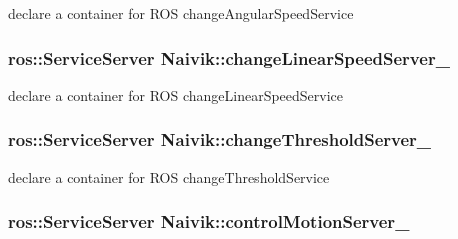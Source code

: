 declare a container for R\+OS change\+Angular\+Speed\+Service 

\subsubsection[{\texorpdfstring{change\+Linear\+Speed\+Server\+\_\+}{changeLinearSpeedServer_}}]{\setlength{\rightskip}{0pt plus 5cm}ros\+::\+Service\+Server Naivik\+::change\+Linear\+Speed\+Server\+\_\+\hspace{0.3cm}{\ttfamily [private]}}\hypertarget{classNaivik_a350e4f31ff9ef9e62b2d4b6c9df6fb23}{}\label{classNaivik_a350e4f31ff9ef9e62b2d4b6c9df6fb23}


declare a container for R\+OS change\+Linear\+Speed\+Service 

\subsubsection[{\texorpdfstring{change\+Threshold\+Server\+\_\+}{changeThresholdServer_}}]{\setlength{\rightskip}{0pt plus 5cm}ros\+::\+Service\+Server Naivik\+::change\+Threshold\+Server\+\_\+\hspace{0.3cm}{\ttfamily [private]}}\hypertarget{classNaivik_a7792b0bfe36fe70c679971470b4cc649}{}\label{classNaivik_a7792b0bfe36fe70c679971470b4cc649}


declare a container for R\+OS change\+Threshold\+Service 

\subsubsection[{\texorpdfstring{control\+Motion\+Server\+\_\+}{controlMotionServer_}}]{\setlength{\rightskip}{0pt plus 5cm}ros\+::\+Service\+Server Naivik\+::control\+Motion\+Server\+\_\+\hspace{0.3cm}{\ttfamily [private]}}\hypertarget{classNaivik_a89a480a5925204ab179dfe0717e26436}{}\label{classNaivik_a89a480a5925204ab179dfe0717e26436}


